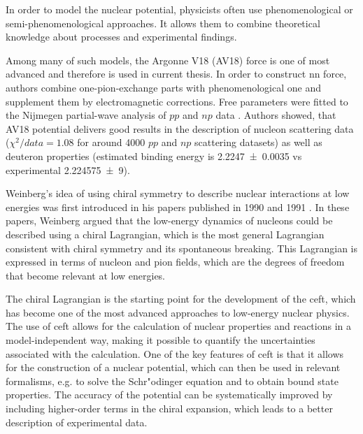 In order to model the nuclear potential, physicists often use phenomenological
or semi-phenomenological approaches. It allows them to combine
theoretical knowledge about processes and experimental findings.

Among many of such models, the Argonne V18 (AV18) \cite{AV18Wiringa} force is one of most
advanced and therefore is used in current thesis.
In order to construct \gls{nn} force, authors combine
one-pion-exchange parts
with phenomenological one and supplement them by electromagnetic corrections.
Free parameters were fitted to
the Nijmegen partial-wave analysis of $pp$ and $np$ data \cite{NijmegenPhysRevC.48.792}. 
Authors showed, that AV18 potential delivers good results
in the description of nucleon scattering data ($\chi ^2/data = 1.08$ for around \num{4000} $pp$ and $np$ scattering datasets) 
as well as deuteron properties (estimated binding energy is \SI{2.2247(35)}{\mev} vs experimental \SI{ 2.224 575(9)}{\mev}).

Weinberg's idea of using chiral symmetry to describe nuclear interactions at low
energies was first introduced in his papers published in 1990 and 1991 \cite{WEINBERG1990,WEINBERG1991}.
In these papers, Weinberg argued that the low-energy dynamics of nucleons
could be described using a chiral Lagrangian, which is the most general
Lagrangian consistent with chiral symmetry and its spontaneous breaking.
This Lagrangian is expressed in terms of nucleon and pion fields,
which are the degrees of freedom that become relevant at low energies.

The chiral Lagrangian is the starting point for the development of
the \gls{ceft}, which has become one of the
most advanced approaches to low-energy nuclear physics.
The use of \gls{ceft} allows for the calculation of nuclear properties
and reactions in a model-independent way, making it possible to
quantify the uncertainties associated with the calculation. One of the
key features of \gls{ceft} is that it allows for the construction of
a nuclear potential, which can then be used in relevant formalisms, e.g. to solve the Schr"odinger
equation and to obtain bound state properties. The accuracy of the
potential can be systematically improved by including higher-order
terms in the chiral expansion, which leads to a better description of
experimental data.

 
